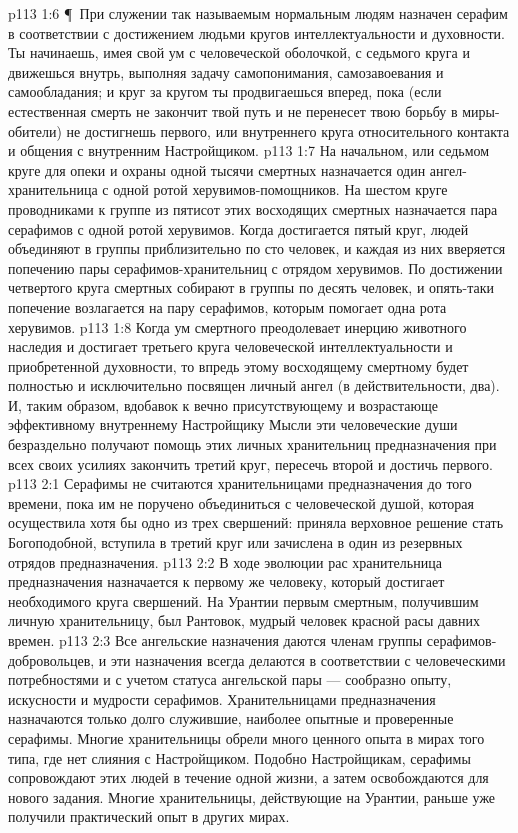 \vs p113 1:6 \P\ При служении так называемым нормальным людям назначен серафим в соответствии с достижением людьми кругов интеллектуальности и духовности. Ты начинаешь, имея свой ум с человеческой оболочкой, с седьмого круга и движешься внутрь, выполняя задачу самопонимания, самозавоевания и самообладания; и круг за кругом ты продвигаешься вперед, пока (если естественная смерть не закончит твой путь и не перенесет твою борьбу в миры\hyp{}обители) не достигнешь первого, или внутреннего круга относительного контакта и общения с внутренним Настройщиком.
\vs p113 1:7 На начальном, или седьмом круге для опеки и охраны одной тысячи смертных назначается один ангел\hyp{}хранительница с одной ротой херувимов\hyp{}помощников. На шестом круге проводниками к группе из пятисот этих восходящих смертных назначается пара серафимов с одной ротой херувимов. Когда достигается пятый круг, людей объединяют в группы приблизительно по сто человек, и каждая из них вверяется попечению пары серафимов\hyp{}хранительниц с отрядом херувимов. По достижении четвертого круга смертных собирают в группы по десять человек, и опять\hyp{}таки попечение возлагается на пару серафимов, которым помогает одна рота херувимов.
\vs p113 1:8 Когда ум смертного преодолевает инерцию животного наследия и достигает третьего круга человеческой интеллектуальности и приобретенной духовности, то впредь этому восходящему смертному будет полностью и исключительно посвящен личный ангел (в действительности, два). И, таким образом, вдобавок к вечно присутствующему и возрастающе эффективному внутреннему Настройщику Мысли эти человеческие души безраздельно получают помощь этих личных хранительниц предназначения при всех своих усилиях закончить третий круг, пересечь второй и достичь первого.
\vs p113 2:1 Серафимы не считаются хранительницами предназначения до того времени, пока им не поручено объединиться с человеческой душой, которая осуществила хотя бы одно из трех свершений: приняла верховное решение стать Богоподобной, вступила в третий круг или зачислена в один из резервных отрядов предназначения.
\vs p113 2:2 В ходе эволюции рас хранительница предназначения назначается к первому же человеку, который достигает необходимого круга свершений. На Урантии первым смертным, получившим личную хранительницу, был Рантовок, мудрый человек красной расы давних времен.
\vs p113 2:3 Все ангельские назначения даются членам группы серафимов\hyp{}добровольцев, и эти назначения всегда делаются в соответствии с человеческими потребностями и с учетом статуса ангельской пары --- сообразно опыту, искусности и мудрости серафимов. Хранительницами предназначения назначаются только долго служившие, наиболее опытные и проверенные серафимы. Многие хранительницы обрели много ценного опыта в мирах того типа, где нет слияния с Настройщиком. Подобно Настройщикам, серафимы сопровождают этих людей в течение одной жизни, а затем освобождаются для нового задания. Многие хранительницы, действующие на Урантии, раньше уже получили практический опыт в других мирах.
